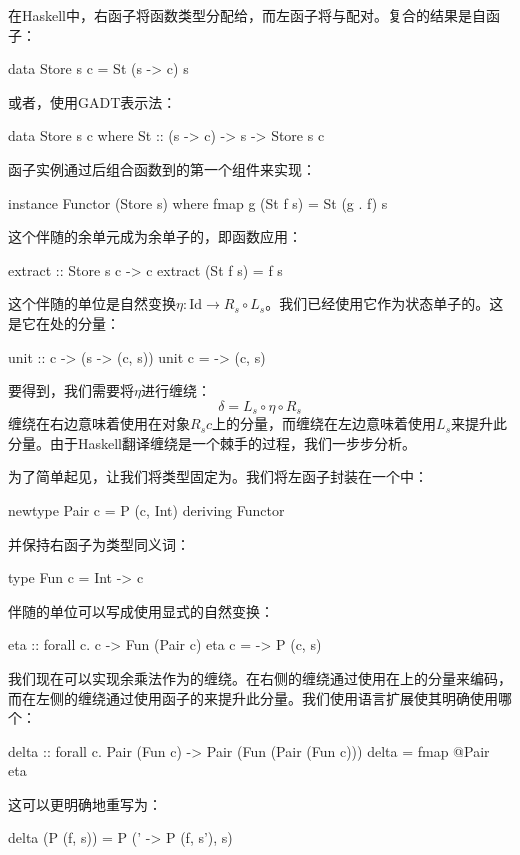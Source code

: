 \documentclass[DaoFP]{subfiles}
\begin{document}
在Haskell中，右函子将函数类型分配给，而左函子将与配对。复合的结果是自函子：
\begin{haskell}
data Store s c = St (s -> c) s
\end{haskell}
或者，使用GADT表示法：
\begin{haskell}
data Store s c where
St :: (s -> c) -> s -> Store s c
\end{haskell}
函子实例通过后组合函数到的第一个组件来实现：
\begin{haskell}
instance Functor (Store s) where
fmap g (St f s) = St (g . f) s
\end{haskell}

这个伴随的余单元成为余单子的，即函数应用：
\begin{haskell}
extract :: Store s c -> c
extract (St f s) = f s
\end{haskell}
这个伴随的单位是自然变换$\eta \colon \text{Id} \to R_s \circ L_s$。我们已经使用它作为状态单子的。这是它在处的分量：
\begin{haskell}
unit :: c -> (s -> (c, s))
unit c = \s -> (c, s)
\end{haskell}
要得到，我们需要将$\eta$进行缠绕：
\[ \delta = L_s  \circ \eta \circ R_s \]
缠绕在右边意味着使用在对象$R_s c$上的分量，而缠绕在左边意味着使用$L_s$来提升此分量。由于Haskell翻译缠绕是一个棘手的过程，我们一步步分析。

为了简单起见，让我们将类型固定为。我们将左函子封装在一个中：
\begin{haskell}
newtype Pair c = P (c, Int)
deriving Functor
\end{haskell}
并保持右函子为类型同义词：
\begin{haskell}
type Fun c = Int -> c
\end{haskell}
伴随的单位可以写成使用显式的自然变换：
\begin{haskell}
eta :: forall c. c -> Fun (Pair c)
eta c = \s -> P (c, s)
\end{haskell}

我们现在可以实现余乘法作为的缠绕。在右侧的缠绕通过使用在上的分量来编码，而在左侧的缠绕通过使用函子的来提升此分量。我们使用语言扩展使其明确使用哪个：
\begin{haskell}
delta :: forall c. Pair (Fun c) -> Pair (Fun (Pair (Fun c)))
delta = fmap @Pair eta
\end{haskell}
这可以更明确地重写为：
\begin{haskell}
delta (P (f, s)) = P (\s' -> P (f, s'), s)
\end{haskell}
\end{document}
